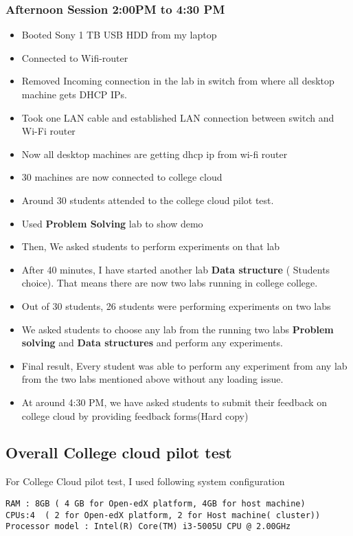 \documentclass[11pt]{article}
\begin{document}
\subsubsection{Afternoon Session 2:00PM to 4:30 PM}
\label{sec-3-2-2}
\begin{itemize}
\item Booted Sony 1 TB USB HDD from my laptop
\item Connected to Wifi-router
\item Removed Incoming connection in the lab in switch from where
all desktop machine gets DHCP IPs.

\item Took one LAN cable and established LAN connection between
switch and Wi-Fi router
\item Now all desktop machines are getting dhcp ip from wi-fi router
\item 30 machines are now connected to college cloud
\item Around 30 students attended to the college cloud pilot
test.
\item Used \textbf{Problem Solving} lab to show demo
\item Then, We asked students to perform experiments on that lab
\item After 40 minutes, I have started another lab \textbf{Data structure} (
Students choice). That means there are now two labs running in
college college.
\item Out of 30 students, 26 students were performing experiments on
two labs
\item We asked students to choose any lab from the running two labs
\textbf{Problem solving} and \textbf{Data structures} and perform any
experiments.
\item Final result, Every student was able to perform any experiment
from any lab from the two labs mentioned above without any
loading issue.
\item At around 4:30 PM, we have asked students to submit their
feedback  on college cloud by providing feedback forms(Hard
copy)
\end{itemize}













\subsection{Overall College cloud pilot test}
\label{sec-3-3}
For College Cloud pilot test, I used following system configuration
\begin{verbatim}
RAM : 8GB ( 4 GB for Open-edX platform, 4GB for host machine)
CPUs:4  ( 2 for Open-edX platform, 2 for Host machine( cluster))
Processor model : Intel(R) Core(TM) i3-5005U CPU @ 2.00GHz
\end{verbatim}
\end{document}
